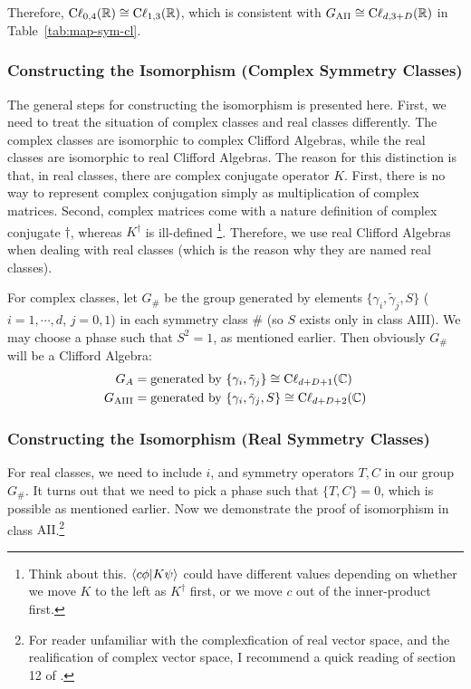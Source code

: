 Therefore, $\mathrm{C\ell}_{0,4}(\mathbb{R}) \cong \mathrm{C\ell}_{1,3}(\mathbb{R}) $, which is
consistent with $G_{\mathrm{AII}} \cong
\mathrm{C\ell}_{d,3+D}(\mathbb{R})$ in Table~\ref{tab:map-sym-cl}.

\subsubsection{Constructing the Isomorphism (Complex Symmetry Classes)}
\label{sec:Complex Classes-iso}
The general steps for constructing the isomorphism is presented here. First, we
need to treat the situation of complex classes and real classes
differently. The complex classes are isomorphic to complex Clifford Algebras,
while the real classes are isomorphic to real Clifford Algebras. The reason for
this distinction is that, in real classes, there are complex conjugate operator
$K$. First, there is no way to represent complex conjugation simply as
multiplication of complex matrices. Second, complex matrices come with a nature
definition of complex conjugate $\dagger$, whereas $K^\dagger$ is ill-defined
\footnote{Think about this. $\braket{c \phi |K \psi}$ could have different
    values depending on whether we move $K$ to the left as $K^\dagger$ first, or
we move $c$ out of the inner-product first.}. Therefore, we use real Clifford
Algebras when dealing with real classes (which is the reason why they are named
real classes).

For complex classes, let $G_\#$ be the group generated by elements
$\{\gamma_i,\tilde{\gamma}_j,S\}$ ($i=1,\cdots,d$, $j=0,1$) in each symmetry
class $\#$ (so $S$ exists only in class $\mathrm{AIII}$). We may choose a phase
such that $S^2=1$, as mentioned earlier. Then obviously $G_\#$ will be a
Clifford Algebra:
\begin{align}
    G_{A} &= \text{generated by }\{\gamma_i,\tilde{\gamma}_j\} \cong
    \mathrm{C\ell}_{d+D+1}(\mathbb{C}) \\
    G_{\mathrm{AIII}} &= \text{generated by }\{\gamma_i,\tilde{\gamma}_j,S\}
    \cong  \mathrm{C\ell}_{d+D+2}(\mathbb{C})
\end{align}

\subsubsection{Constructing the Isomorphism (Real Symmetry Classes)}
\label{sec:Real Classes-iso}

For real classes, we need to include $i$, and symmetry operators $T,C$ in our
group $G_\#$. It turns out that we need to pick a phase such that $\{T,C\}=0$,
which is possible as mentioned earlier. Now we demonstrate the proof of
isomorphism in class $\mathrm{AII}$.\footnote{For reader unfamiliar with the
complexfication of real vector space, and the realification of complex vector
space, I recommend a quick reading of section 12 of \cite{suetin1989linear}.}

